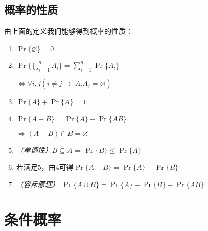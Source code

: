 \subsection{概率的性质}
由上面的定义我们能够得到概率的性质：
\begin{enumerate}
    \item
          \(\Pr\{\varnothing\}=0\)
    \item
          \(\Pr\{\bigcup_{i=1}^{n} A_i\}=\sum_{i=1}^n\Pr\{A_i\}\)

          \(\iff\forall i,j(i\neq j\rightarrow\; A_iA_j = \varnothing)\)
    \item
          \(\Pr\{\overline A\} + \Pr\{A\} = 1\)
    \item
          \(\Pr\{A-B\} = \Pr\{A\} - \Pr\{AB\}\)

          \(\Rightarrow (A-B) \cap B = \varnothing\)
    \item
          \textit{（单调性）}\(B\subseteq A \Rightarrow \Pr\{B\}\leq\Pr\{A\}\)
    \item
          若满足5，由4可得\(\Pr\{A-B\} = \Pr\{A\} - \Pr\{B\}\)
    \item
          \textit{（容斥原理）}
          \(\Pr\{A\cup B\}=\Pr\{A\} + \Pr\{B\} - \Pr\{AB\}\)
\end{enumerate}
\section{条件概率}
